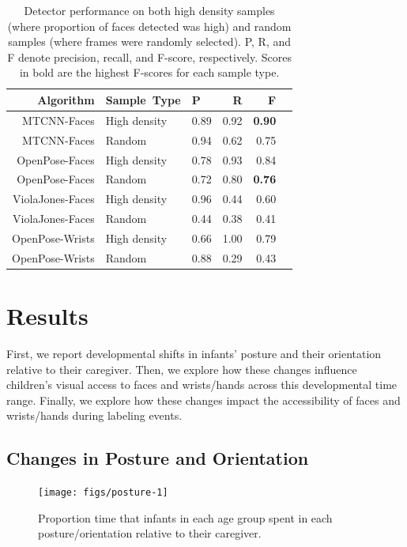 \documentclass[10pt, letterpaper]{article}
\newenvironment{CodeChunk}{}{}
\begin{document}
\begin{table}[ht]
\centering
\begin{tabular}{rllrrr}
  \hline
   Algorithm & Sample\ Type & P & R & F \\ 
  \hline
  MTCNN-Faces & High density & 0.89 & 0.92 & \textbf{0.90} \\ 
  MTCNN-Faces & Random & 0.94 & 0.62 & 0.75 \\ 
  OpenPose-Faces & High density & 0.78 & 0.93 & 0.84 \\ 
  OpenPose-Faces & Random & 0.72 & 0.80 & \textbf{0.76} \\ 
  ViolaJones-Faces & High density & 0.96 & 0.44 & 0.60 \\ 
  ViolaJones-Faces & Random & 0.44 & 0.38 & 0.41 \\ 
  OpenPose-Wrists & High density & 0.66 & 1.00 & 0.79 \\ 
  OpenPose-Wrists & Random & 0.88 & 0.29 & 0.43 \\ 
   \hline
\end{tabular}
\caption{Detector performance on both high density samples (where proportion of faces detected was high) and random samples (where frames were randomly selected). P, R, and F denote precision, recall, and F-score, respectively. Scores in bold are the highest F-scores for each sample type.} 
\end{table}

\section{Results}\label{results}

First, we report developmental shifts in infants' posture and their
orientation relative to their caregiver. Then, we explore how these
changes influence children's visual access to faces and wrists/hands
across this developmental time range. Finally, we explore how these
changes impact the accessibility of faces and wrists/hands during
labeling events.

\subsection{Changes in Posture and
Orientation}\label{changes-in-posture-and-orientation}

\begin{CodeChunk}
\begin{figure}[h]

{\centering \texttt{[image: figs/posture-1]} 

}

\caption[Proportion time that infants in each age group spent in each posture/orientation relative to their caregiver]{Proportion time that infants in each age group spent in each posture/orientation relative to their caregiver.}\label{fig:posture}
\end{figure}
\end{CodeChunk}
\end{document}
